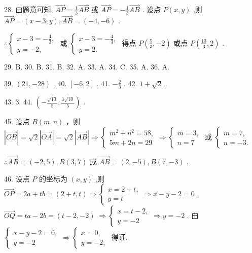 \documentclass[10pt]{article}
\begin{document}
28. 由题意可知, \(\overrightarrow{AP} = \frac{1}{3}\overrightarrow{AB}\) 或 \(\overrightarrow{AP} =  - \frac{1}{3}\overrightarrow{AB}\) . 设点 \(P\left( {x,y}\right)\) ,则 \(\overrightarrow{AP} = \left( {x - 3,y}\right) ,\overrightarrow{AB} = \left( {-4, - 6}\right)\) .

\(\therefore \left\{  {\begin{array}{l} x - 3 =  - \frac{4}{3}, \\  y =  - 2, \end{array}\text{ 或 }\left\{  \begin{array}{l} x - 3 =  - \frac{4}{3}, \\  y = 2. \end{array}\right. }\right.\) 得点 \(P\left( {\frac{5}{3}, - 2}\right)\) 或点 \(P\left( {\frac{13}{3},2}\right)\) .

29. B. 30. B. 31. B. 32. A. 33. A. 34. C. 35. A. 36. A.

39. \(\left( {{21}, - {28}}\right)\) . 40. \(\left\lbrack  {-6,2}\right\rbrack\) . 41. \(- \frac{2}{3}\) . 42. \(1 + \sqrt{2}\) .

43. 3. 44. \(\left( {-\frac{\sqrt{10}}{5},\frac{3\sqrt{10}}{5}}\right)\) .

45. 设点 \(B\left( {m,n}\right)\) ，则 \(\left| \overrightarrow{OB}\right|  = \sqrt{2}\left| \overrightarrow{OA}\right|  = \sqrt{2}\left| \overrightarrow{AB}\right|  \Rightarrow  \left\{  {\begin{array}{l} {m}^{2} + {n}^{2} = {58}, \\  {5m} + {2n} = {29} \end{array} \Rightarrow  \left\{  \begin{array}{l} m = 3, \\  n = 7 \end{array}\right. }\right.\) 或 \(\left\{  \begin{array}{l} m = 7, \\  n =  - 3. \end{array}\right.\)

\(\therefore \overrightarrow{AB} = \left( {-2,5}\right) ,B\left( {3,7}\right)\) 或 \(\overrightarrow{AB} = \left( {2, - 5}\right) ,B\left( {7, - 3}\right)\) .

46. 设点 \(P\) 的坐标为 \(\left( {x,y}\right)\) ,则 \(\overrightarrow{OP} = {2a} + {tb} = \left( {2 + t,t}\right)  \Rightarrow  \left\{  {\begin{array}{l} x = 2 + t, \\  y = t \end{array} \Rightarrow  x - y - 2 = 0}\right.\) , \(\overrightarrow{OQ} = {ta} - {2b} = \left( {t - 2, - 2}\right) \; \Rightarrow  \left\{  {\begin{array}{l} x = t - 2, \\  y =  - 2 \end{array} \Rightarrow  y =  - 2}\right.\) . 由 \(\left\{  {\begin{array}{l} x - y - 2 = 0, \\  y =  - 2 \end{array} \Rightarrow  \left\{  \begin{array}{l} x = 0, \\  y =  - 2, \end{array}\right. }\right.\) 得证.
\end{document}
